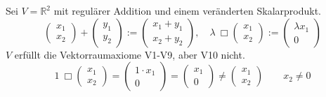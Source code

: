 \begin{example}
    Sei $V=\mathbb{R}^2$ mit regulärer Addition und einem veränderten Skalarprodukt.
    \[
        \begin{pmatrix}
            x_1\\x_2
        \end{pmatrix} + \begin{pmatrix}
            y_1\\y_2
        \end{pmatrix} := \begin{pmatrix}
            x_1 + y_1 \\ x_2 + y_2
        \end{pmatrix},\quad \lambda\ \Box \begin{pmatrix}
            x_1\\x_2
        \end{pmatrix} := \begin{pmatrix}
            \lambda x_1\\
            0
        \end{pmatrix}
    \]
    $V$ erfüllt die Vektorraumaxiome V1-V9, aber V10 nicht.
    \[
        1\ \Box \begin{pmatrix}
            x_1\\x_2
        \end{pmatrix} = \begin{pmatrix}
            1\cdot x_1\\
            0
        \end{pmatrix} = \begin{pmatrix}
            x_1\\0
        \end{pmatrix}\neq \begin{pmatrix}
            x_1\\x_2
        \end{pmatrix}\qquad x_2 \neq 0
    \]
\end{example}